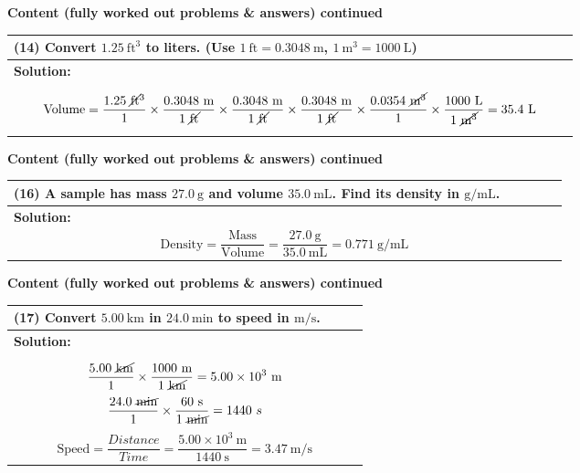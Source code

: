 \documentclass{article}
\begin{document}
\noindent
{\large \textbf{Content (fully worked out problems \& answers) continued}} \\[0.2em]
\begin{tabular}{|p{0.9\linewidth}|}
\hline
\vspace{0.2cm}

\textbf{(14)} Convert $1.25~\text{ft}^3$ to liters. (Use $1~\text{ft}=0.3048~\text{m}$, $1~\text{m}^3=1000~\text{L}$) \\
\hline
\textbf{Solution:} \\
\[
\text{Volume} = \frac{1.25~\cancel{\text{ft}}^3}{1} \times \frac{0.3048~\text{m}}{1~\cancel{\text{ft}}} \times \frac{0.3048~\text{m}}{1~\cancel{\text{ft}}} \times \frac{0.3048~\text{m}}{1~\cancel{\text{ft}}} \times \frac{0.0354~\cancel{\text{m}^3}}{1} \times \frac{1000~\text{L}}{1~\cancel{\text{m}^3}}
= 35.4~\text{L}
\] \\
\hline
\end{tabular}
\newpage

\noindent
{\large \textbf{Content (fully worked out problems \& answers) continued}} \\[0.2em]
\begin{tabular}{|p{0.9\linewidth}|}
\hline
\vspace{0.2cm}

\textbf{(16)} A sample has mass $27.0~\text{g}$ and volume $35.0~\text{mL}$. Find its density in $\text{g/mL}$. \\
\hline
\textbf{Solution:} \\
\[
\text{Density} = \frac{\text{Mass}}{\text{Volume}}
= \frac{27.0~\text{g}}{35.0~\text{mL}}
= 0.771~\text{g/mL}
\] \\
\hline
\end{tabular}
\newpage

\noindent
{\large \textbf{Content (fully worked out problems \& answers) continued}} \\[0.2em]
\begin{tabular}{|p{0.9\linewidth}|}
\hline
\vspace{0.2cm}

\textbf{(17)} Convert $5.00~\text{km}$ in $24.0~\text{min}$ to speed in $\text{m/s}$. \\
\hline
\textbf{Solution:} \\
\[
\frac{5.00~\cancel{\text{km}}}{1} \times \frac{1000~\text{m}}{1~\cancel{\text{km}}}
= 5.00\times 10^3~\text{m}
\]
\[
\frac{24.0~\cancel{\text{min}}}{1} \times \frac{60~\text{s}}{1~\cancel{\text{min}}}
= 1440~s
\]
\[
\text{Speed}=\frac{Distance}{Time}
= \frac{5.00\times 10^3~\text{m}}{1440~\text{s}}
= 3.47~\text{m/s}
\] \\
\hline
\end{tabular}
\newpage
\end{document}
